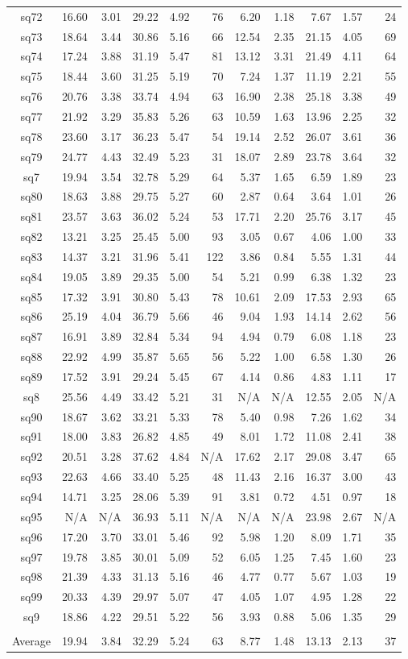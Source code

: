 {\begin{longtable}{@{}cr@{\hspace{1em}}r@{\hspace{1em}}r@{\hspace{1em}}r@{\hspace{1em}}r@{\hspace{2em}}r@{\hspace{1em}}r@{\hspace{1em}}r@{\hspace{1em}}r@{\hspace{1em}}r@{}}
sq72&16.60&3.01&29.22&4.92&76&6.20&1.18&7.67&1.57&24\\
sq73&18.64&3.44&30.86&5.16&66&12.54&2.35&21.15&4.05&69\\
sq74&17.24&3.88&31.19&5.47&81&13.12&3.31&21.49&4.11&64\\
sq75&18.44&3.60&31.25&5.19&70&7.24&1.37&11.19&2.21&55\\
sq76&20.76&3.38&33.74&4.94&63&16.90&2.38&25.18&3.38&49\\
sq77&21.92&3.29&35.83&5.26&63&10.59&1.63&13.96&2.25&32\\
sq78&23.60&3.17&36.23&5.47&54&19.14&2.52&26.07&3.61&36\\
sq79&24.77&4.43&32.49&5.23&31&18.07&2.89&23.78&3.64&32\\
sq7&19.94&3.54&32.78&5.29&64&5.37&1.65&6.59&1.89&23\\
sq80&18.63&3.88&29.75&5.27&60&2.87&0.64&3.64&1.01&26\\
sq81&23.57&3.63&36.02&5.24&53&17.71&2.20&25.76&3.17&45\\
sq82&13.21&3.25&25.45&5.00&93&3.05&0.67&4.06&1.00&33\\
sq83&14.37&3.21&31.96&5.41&122&3.86&0.84&5.55&1.31&44\\
sq84&19.05&3.89&29.35&5.00&54&5.21&0.99&6.38&1.32&23\\
sq85&17.32&3.91&30.80&5.43&78&10.61&2.09&17.53&2.93&65\\
sq86&25.19&4.04&36.79&5.66&46&9.04&1.93&14.14&2.62&56\\
sq87&16.91&3.89&32.84&5.34&94&4.94&0.79&6.08&1.18&23\\
sq88&22.92&4.99&35.87&5.65&56&5.22&1.00&6.58&1.30&26\\
sq89&17.52&3.91&29.24&5.45&67&4.14&0.86&4.83&1.11&17\\
sq8&25.56&4.49&33.42&5.21&31&N/A&N/A&12.55&2.05&N/A\\
sq90&18.67&3.62&33.21&5.33&78&5.40&0.98&7.26&1.62&34\\
sq91&18.00&3.83&26.82&4.85&49&8.01&1.72&11.08&2.41&38\\
sq92&20.51&3.28&37.62&4.84&N/A&17.62&2.17&29.08&3.47&65\\
sq93&22.63&4.66&33.40&5.25&48&11.43&2.16&16.37&3.00&43\\
sq94&14.71&3.25&28.06&5.39&91&3.81&0.72&4.51&0.97&18\\
sq95&N/A&N/A&36.93&5.11&N/A&N/A&N/A&23.98&2.67&N/A\\
sq96&17.20&3.70&33.01&5.46&92&5.98&1.20&8.09&1.71&35\\
sq97&19.78&3.85&30.01&5.09&52&6.05&1.25&7.45&1.60&23\\
sq98&21.39&4.33&31.13&5.16&46&4.77&0.77&5.67&1.03&19\\
sq99&20.33&4.39&29.97&5.07&47&4.05&1.07&4.95&1.28&22\\
sq9&18.86&4.22&29.51&5.22&56&3.93&0.88&5.06&1.35&29\\
\\\midrule
Average&19.94&3.84&32.29&5.24&63&8.77&1.48&13.13&2.13&37\\ \bottomrule
\end{longtable}}
